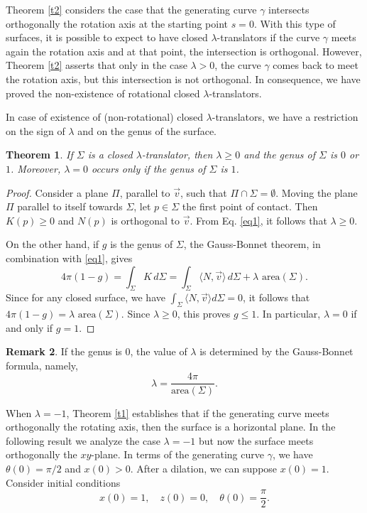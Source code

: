 \documentclass[12pt]{amsart}
\newtheorem{theorem}{Theorem}[section]
\theoremstyle{definition}
\newtheorem{remark}[theorem]{Remark}
\begin{document}
 
Theorem \ref{t2} considers the case that the generating curve $\gamma$ intersects orthogonally the rotation axis   at the starting point $s=0$. With this type of surfaces, it is possible to expect to   have closed $\lambda$-translators if the curve $\gamma$ meets again the rotation axis and at that point, the  intersection is orthogonal.  However, Theorem \ref{t2} asserts that only in the case $\lambda>0$, the curve $\gamma$ comes back to meet the rotation axis, but this intersection is not orthogonal. In consequence, we have proved the non-existence of rotational closed $\lambda$-translators. 

In case of existence of (non-rotational) closed $\lambda$-translators,  we have a restriction on the sign of $\lambda$ and on the genus of the surface.  

\begin{theorem}\label{t-gb} If $\Sigma$ is a closed $\lambda$-translator, then $\lambda\geq 0$ and the genus of $\Sigma$ is $0$ or $1$. Moreover, $\lambda=0$ occurs only if the genus of $\Sigma$ is $1$.

\end{theorem}
\begin{proof}  
Consider a plane $\Pi$, parallel to $\vec{v}$,  such that $\Pi \cap \Sigma = \emptyset$. Moving the plane $\Pi$ parallel to itself towards $\Sigma$, let $p\in\Sigma$ the first point of contact. Then $K(p)\geq 0$ and $N(p)$ is orthogonal to $\vec{v}$. From Eq. \eqref{eq1}, it follows that $\lambda\geq 0$. 

On the other hand, if $g$ is the genus of $\Sigma$, the Gauss-Bonnet theorem, in combination with \eqref{eq1}, gives
$$
4\pi(1-g)=\int_\Sigma K\, d\Sigma=\int_\Sigma \langle N , \vec{v}  \rangle \, d\Sigma+   \lambda\mbox{ area}(\Sigma).$$
Since for any closed surface, we have $\int_\Sigma \langle N , \vec{v}  \rangle d\Sigma=0$, it follows that $4\pi(1-g)=  \lambda\mbox{ area}(\Sigma)$. Since $\lambda\geq 0$, this proves $g\leq 1$. In particular,   $\lambda=0$ if and only if $g=1$. 
\end{proof}



\begin{remark} If the genus is $0$, the value of $\lambda$ is determined by the Gauss-Bonnet formula, namely,  
$$\lambda=\frac{4\pi}{\mbox{area}(\Sigma)}.$$
\end{remark}

 
When  $\lambda=-1$, Theorem \ref{t1} establishes that if the generating curve meets orthogonally the rotating axis, then the surface is a horizontal plane. In the following result we analyze the case $\lambda=-1$ but now the surface   meets orthogonally the $xy$-plane. In terms of the generating curve $\gamma$, we have     $\theta(0)=\pi/2$ and $x(0)>0$. After a dilation, we can suppose $x(0)=1$. Consider initial conditions
\begin{equation}\label{trig3}
x(0)=1, \quad z(0)=0, \quad\theta(0)=\frac{\pi}{2}.
\end{equation}
\end{document}
